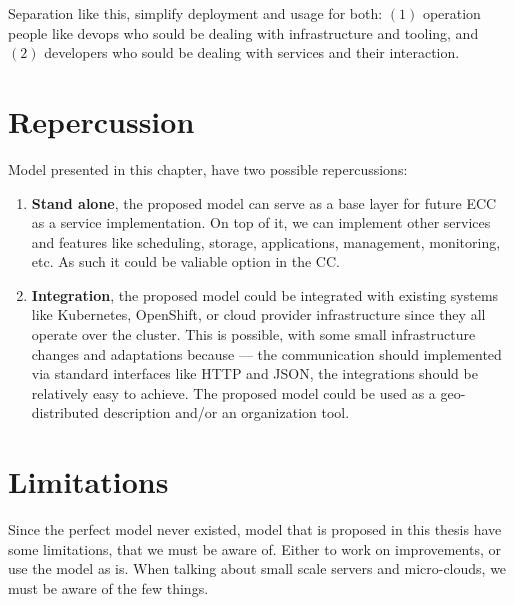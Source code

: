 Separation like this, simplify deployment and usage for both: $(1)$ operation people like devops who sould be dealing with infrastructure and tooling, and $(2)$ developers who sould be dealing with services and their interaction.
%
%
\section{Repercussion}\label{sec:repercussion}
%
Model presented in this chapter, have two possible repercussions:

\begin{enumerate}[start=1,label={(\bfseries \arabic*)}]
	\item \textbf{Stand alone}, the proposed model can serve as a base layer for future ECC as a service implementation. On top of it, we can implement other services and features like scheduling, storage, applications, management, monitoring, etc. As such it could be valiable option in the CC.
	\item \textbf{Integration}, the proposed model could be integrated with existing systems like Kubernetes, OpenShift, or cloud provider infrastructure since they all operate over the cluster. This is possible, with some small infrastructure changes and adaptations because --- the communication should implemented via standard interfaces like HTTP and JSON, the integrations should be relatively easy to achieve. The proposed model could be used as a geo-distributed description and/or an  organization tool.
\end{enumerate} 
%
%
\section{Limitations}\label{sec:limitations}
%
Since the perfect model never existed, model that is proposed in this thesis have some limitations, that we must be aware of. Either to work on improvements, or use the model as is. When talking about small scale servers and micro-clouds, we must be aware of the few things. 

